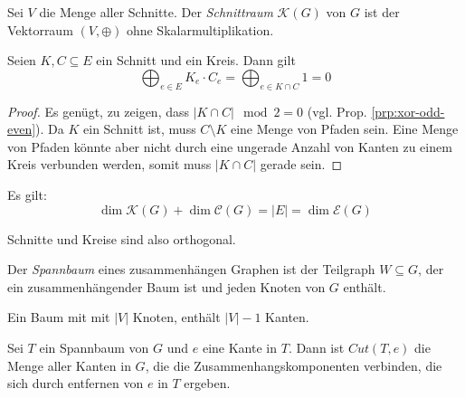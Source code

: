 \begin{definition}[Schnittraum]
    Sei $ V $ die Menge aller Schnitte.
    Der \textit{Schnittraum} $ \mathcal{K}(G) $ von $ G $ ist der Vektorraum $ (V, \oplus) $ ohne Skalarmultiplikation.
\end{definition}

\begin{proposition}
    Seien $ K, C \subseteq E $ ein Schnitt und ein Kreis.
    Dann gilt
    \begin{equation*}
        \bigoplus_{e \in E} K_e \cdot C_e = \bigoplus_{e \in K \cap C} 1 = 0
    \end{equation*}
\end{proposition}

\begin{proof}
    Es genügt, zu zeigen, dass $ |K \cap C| \mod 2 = 0 $ (vgl. Prop. \ref{prp:xor-odd-even}).
    Da $ K $ ein Schnitt ist, muss $ C \setminus K $ eine Menge von Pfaden sein.
    Eine Menge von Pfaden könnte aber nicht durch eine ungerade Anzahl von Kanten zu einem Kreis verbunden werden, somit muss $ |K \cap C| $ gerade sein.
\end{proof}

\begin{proposition}
    Es gilt:
    \begin{equation*}
        \dim \mathcal{K}(G) + \dim \mathcal{C}(G) = |E| = \dim \mathcal{E}(G)
    \end{equation*}
\end{proposition}

\begin{remark}
    Schnitte und Kreise sind also orthogonal.
\end{remark}

\begin{definition}[Spannbaum]
    Der \textit{Spannbaum} eines zusammenhängen Graphen ist der Teilgraph $ W \subseteq G $, der ein zusammenhängender Baum ist und jeden Knoten von $ G $ enthält.
\end{definition}

\begin{remark}
    Ein Baum mit mit $ |V| $ Knoten, enthält $ |V| - 1 $ Kanten.
\end{remark}

\begin{definition}
    Sei $ T $ ein Spannbaum von $ G $ und $ e $ eine Kante in $ T $.
    Dann ist $ Cut(T, e) $ die Menge aller Kanten in $ G $, die die Zusammenhangskomponenten verbinden, die sich durch entfernen von $ e $ in $ T $ ergeben.
\end{definition}

